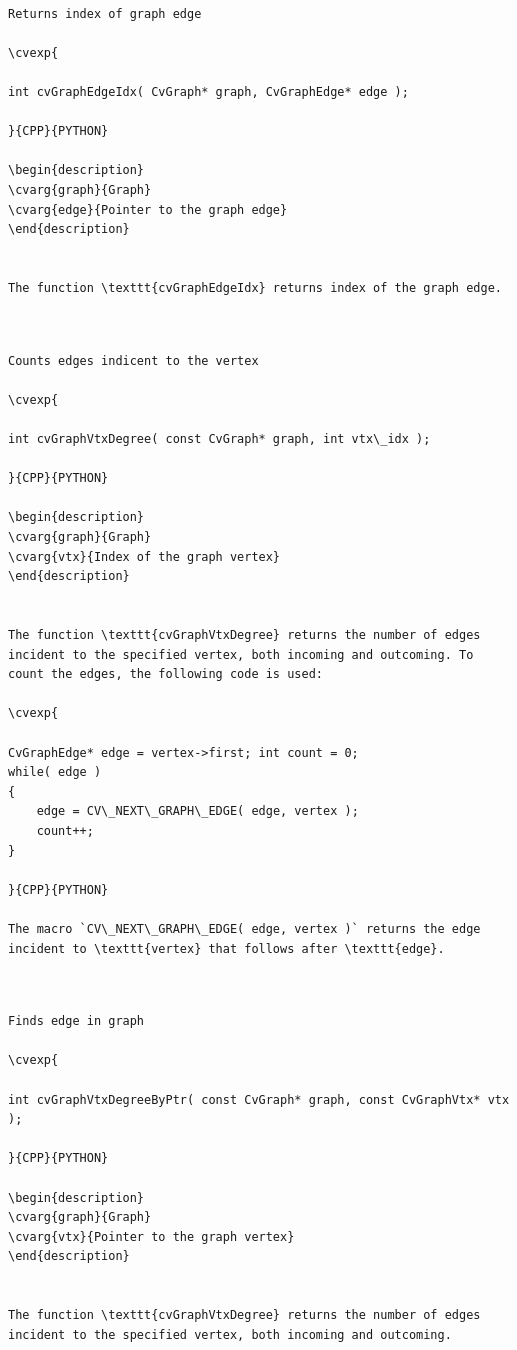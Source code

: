 \label{GraphEdgeIdx}
\begin{verbatim}

Returns index of graph edge

\cvexp{

int cvGraphEdgeIdx( CvGraph* graph, CvGraphEdge* edge );

}{CPP}{PYTHON}

\begin{description}
\cvarg{graph}{Graph}
\cvarg{edge}{Pointer to the graph edge}
\end{description}


The function \texttt{cvGraphEdgeIdx} returns index of the graph edge.


\end{verbatim}
\label{GraphVtxDegree}
\begin{verbatim}

Counts edges indicent to the vertex

\cvexp{

int cvGraphVtxDegree( const CvGraph* graph, int vtx\_idx );

}{CPP}{PYTHON}

\begin{description}
\cvarg{graph}{Graph}
\cvarg{vtx}{Index of the graph vertex}
\end{description}


The function \texttt{cvGraphVtxDegree} returns the number of edges incident to the specified vertex, both incoming and outcoming. To count the edges, the following code is used:

\cvexp{

CvGraphEdge* edge = vertex->first; int count = 0;
while( edge )
{
    edge = CV\_NEXT\_GRAPH\_EDGE( edge, vertex );
    count++;
}

}{CPP}{PYTHON}

The macro `CV\_NEXT\_GRAPH\_EDGE( edge, vertex )` returns the edge incident to \texttt{vertex} that follows after \texttt{edge}.


\end{verbatim}
\label{GraphVtxDegreeByPtr}
\begin{verbatim}

Finds edge in graph

\cvexp{

int cvGraphVtxDegreeByPtr( const CvGraph* graph, const CvGraphVtx* vtx );

}{CPP}{PYTHON}

\begin{description}
\cvarg{graph}{Graph}
\cvarg{vtx}{Pointer to the graph vertex}
\end{description}


The function \texttt{cvGraphVtxDegree} returns the number of edges incident to the specified vertex, both incoming and outcoming.


\end{verbatim}
